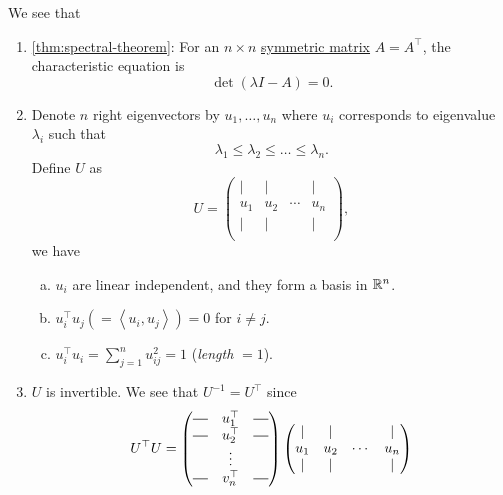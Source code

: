 
\newcommand*{\horzbar}{\rule[.5ex]{2.5ex}{0.5pt}}
\begin{prev}
	We see that
	\begin{enumerate}
		\item \autoref{thm:spectral-theorem}: For an \(n\times n\) \hyperref[def:symmetric-matrix]{symmetric matrix} \(A = A^{\top}\), the
		      characteristic equation is
		      \[
			      \det(\lambda I - A) = 0.
		      \]
		\item Denote \(n\) right eigenvectors by \(u_1, \ldots , u_n\) where \(u_{i} \) corresponds to eigenvalue \(\lambda _i\) such that
		      \[
			      \lambda _1 \leq \lambda _2 \leq \ldots  \leq \lambda _n.
		      \]
		      Define \(U\) as
		      \[
			      U = \begin{pmatrix}
				      \mid & \mid &        & \mid \\
				      u_1  & u_2  & \cdots & u_n  \\
				      \mid & \mid &        & \mid \\
			      \end{pmatrix},
		      \]
		      we have
		      \begin{enumerate}[(a)]
			      \item \(u_i\) are linear independent, and they form a basis in \(\mathbb{\MakeUppercase{r}} ^n\).
			      \item \(u_{i} ^{\top} u_{j} ( = \left< u_{i} , u_{j}  \right> ) = 0\) for \(i\neq j\).
			      \item \(u_{i} ^{\top} u_{i} = \sum_{j=1}^{n} u_{ij}^{2} = 1 \) (\emph{length} \(= 1\)).
		      \end{enumerate}
		\item \(U\) is invertible. We see that \(U^{-1} = U^{\top} \) since
		      \[
			      U^{\top}U = \begin{pmatrix}
				      \horzbar & u^{\top}_1 & \horzbar \\
				      \horzbar & u^{\top}_2 & \horzbar \\
				               & \vdots     &          \\
				      \horzbar & v^{\top}_n & \horzbar \\
			      \end{pmatrix}\begin{pmatrix}
				      \mid & \mid &        & \mid \\
				      u_1  & u_2  & \cdots & u_n  \\
				      \mid & \mid &        & \mid \\

\end{pmatrix}\]
\end{enumerate}
\end{prev}
